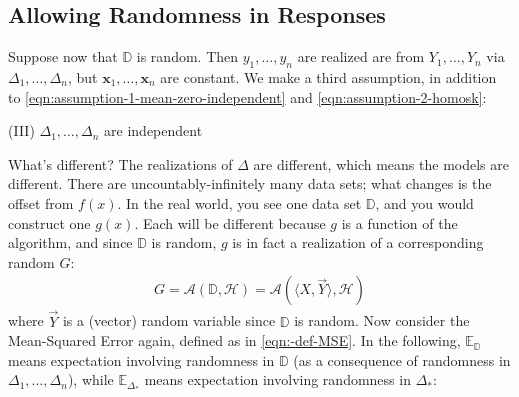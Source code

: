 \documentclass[12pt, a4paper]{article}
\theoremstyle{definition}
\begin{document}
	\subsection*{Allowing Randomness in Responses}
	Suppose now that $\mathbb{D}$ is random. Then $y_1,\ldots,y_n$
	are realized are from $Y_1,\ldots,Y_n$ via $\Delta_1,\ldots,\Delta_n$, but
	$\bm{x}_1,\ldots,\bm{x}_n$ are constant. We make a third assumption,
	in addition to \ref{eqn:assumption-1-mean-zero-independent} and
	\ref{eqn:assumption-2-homosk}:
	\begin{center}
		(III) $\Delta_1,\ldots,\Delta_n$ are independent
	\end{center}
	What's different? The realizations of $\Delta$ are different, which means the
	models are different. There are uncountably-infinitely many data sets; what changes
	is the offset from $f(x)$. In the real world, you see one data set $\mathbb{D}$,
	and you would construct one $g(x)$. Each will be different because $g$ is
	a function of the algorithm, and since $\mathbb{D}$ is random, $g$
	is in fact a realization of a corresponding random $G$:
	\begin{align*}
		G
		= \mathcal{A}(\mathbb{D}, \mathcal{H})
		= \mathcal{A}(\langle X, \vec{Y}\rangle, \mathcal{H})
	\end{align*}
	where $\vec{Y}$ is a (vector) random variable since $\mathbb{D}$ is random.
	Now consider the Mean-Squared Error again, defined as in \ref{eqn:-def-MSE}.
	In the following, $\mathbb{E}_{\mathbb{D}}$ means expectation involving
	randomness in $\mathbb{D}$ (as a consequence of randomness in $\Delta_1,\ldots,\Delta_n$),
	while $\mathbb{E}_{\Delta_*}$ means expectation involving randomness in $\Delta_*$:
\end{document}
